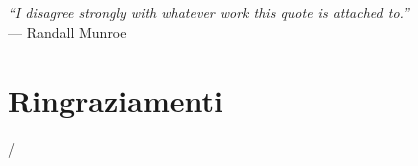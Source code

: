 \cleardoublepage
{}
{}

\begin{flushright}{
    \slshape
    ``I disagree strongly with whatever work this quote is attached to.''} \\
    \medskip
    --- Randall Munroe
\end{flushright}

\begingroup
\let\clearpage\relax
\let\cleardoublepage\relax
\let\cleardoublepage\relax

\chapter*{Ringraziamenti}

\noindent /






\vspace{0.75cm}

\noindent{\myLocation, \myTime}
\hfill \textit{\myName}

\endgroup
